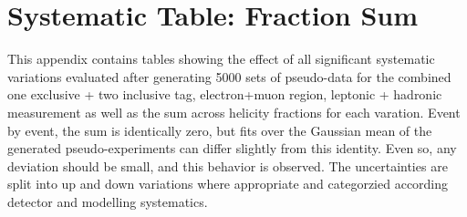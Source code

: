 \clearpage
\section{Systematic Table: Fraction Sum}
\label{app:sumSystTables}
This appendix contains tables showing the effect of all significant systematic variations evaluated after generating 5000 sets of pseudo-data for the combined one exclusive + two inclusive \bt tag, electron+muon region, leptonic + hadronic measurement as well as the sum across helicity fractions for each varation. Event by event, the sum is identically zero, but fits over the Gaussian mean of the generated pseudo-experiments can differ slightly from this identity. Even so, any deviation should be small, and this behavior is observed. The uncertainties are split into up and down variations where appropriate and categorzied according detector and modelling systematics.

